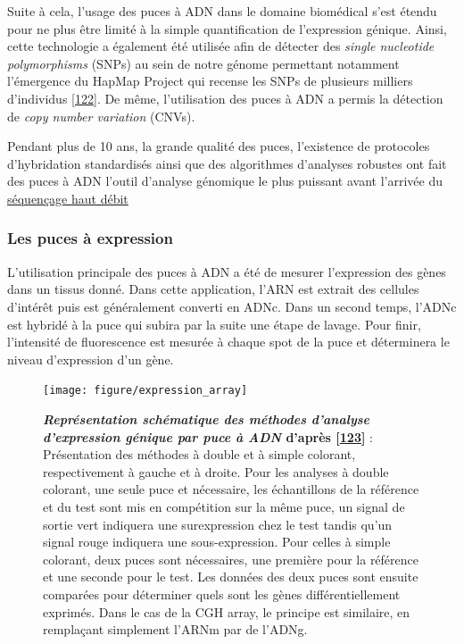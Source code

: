 \documentclass[12pt,a4paper,twoside]{ugathesis}
\theoremstyle{definition}
\theoremstyle{definition}
\theoremstyle{definition}
\theoremstyle{remark}
\begin{document}
Suite à cela, l'usage des puces à ADN dans le domaine biomédical s'est
étendu pour ne plus être limité à la simple quantification de
l'expression génique. Ainsi, cette technologie a également été utilisée
afin de détecter des \emph{single nucleotide polymorphisms} (SNPs) au
sein de notre génome permettant notamment l'émergence du HapMap Project
qui recense les SNPs de plusieurs milliers d'individus
{[}\protect\hyperlink{ref-Cutler2001}{122}{]}. De même, l'utilisation
des puces à ADN a permis la détection de \emph{copy number variation}
(CNVs).

Pendant plus de 10 ans, la grande qualité des puces, l'existence de
protocoles d'hybridation standardisés ainsi que des algorithmes
d'analyses robustes ont fait des puces à ADN l'outil d'analyse génomique
le plus puissant avant l'arrivée du \protect\hyperlink{ngs}{séquençage
haut débit}

\newpage

\subsubsection{Les puces à expression}\label{les-puces-a-expression}

L'utilisation principale des puces à ADN a été de mesurer l'expression
des gènes dans un tissus donné. Dans cette application, l'ARN est
extrait des cellules d'intérêt puis est généralement converti en ADNc.
Dans un second temps, l'ADNc est hybridé à la puce qui subira par la
suite une étape de lavage. Pour finir, l'intensité de fluorescence est
mesurée à chaque spot de la puce et déterminera le niveau d'expression
d'un gène.

\begin{figure}

{\centering \texttt{[image: figure/expression\_array]} 

}

\caption[Représentation schématique des méthodes d'analyse d'expression génique par puce à ADN]{\textbf{\emph{Représentation schématique des méthodes
d'analyse d'expression génique par puce à ADN} d'après
{[}\protect\hyperlink{ref-Trevino2007}{123}{]}} : Présentation des
méthodes à double et à simple colorant, respectivement à gauche et à
droite. Pour les analyses à double colorant, une seule puce et
nécessaire, les échantillons de la référence et du test sont mis en
compétition sur la même puce, un signal de sortie vert indiquera une
surexpression chez le test tandis qu'un signal rouge indiquera une
sous-expression. Pour celles à simple colorant, deux puces sont
nécessaires, une première pour la référence et une seconde pour le test.
Les données des deux puces sont ensuite comparées pour déterminer quels
sont les gènes différentiellement exprimés. Dans le cas de la CGH array,
le principe est similaire, en remplaçant simplement l'ARNm par de
l'ADNg.}\label{fig:pictexparray}
\end{figure}
\end{document}
